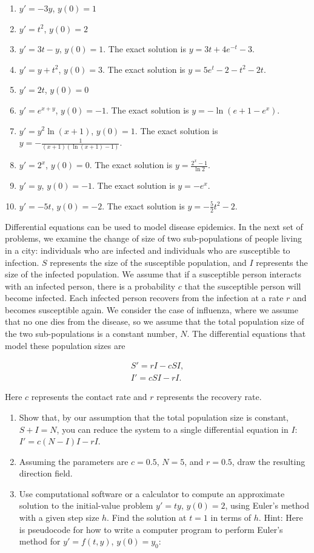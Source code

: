 \documentclass{exercises}
\begin{document}
\begin{enumerate}[resume]
\item $y'=-3y$, $y(0)=1$
\item $y'=t^{2}$, $y(0)=2$
\item $y'=3t-y$, $y(0)=1$. The exact solution is $y=3t+4e^{-t}-3$.
\item $y'=y+t^{2}$, $y(0)=3$. The exact solution is $y=5e^{t}-2-t^{2}-2t$.
\item $y'=2t$, $y(0)=0$
\item \techrequired $y'=e^{x+y}$, $y(0)=-1$. The exact solution is $y=-\ln(e+1-e^{x})$.
\item $y'=y^{2}\ln(x+1)$, $y(0)=1$. The exact solution is $y=-\frac{1}{(x+1)(\ln(x+1)-1)}$.
\item $y'=2^{x}$, $y(0)=0$. The exact solution is $y=\frac{2^{x}-1}{\ln 2}$.
\item $y'=y$, $y(0)=-1$. The exact solution is $y=-e^{x}$.
\item $y'=-5t$, $y(0)=-2$. The exact solution is $y=-\frac{5}{2}t^{2}-2$.
\end{enumerate}

Differential equations can be used to model disease epidemics. In the next set of problems, we examine the change of size of two sub-populations of people living in a city: individuals who are infected and individuals who are susceptible to infection. $S$ represents the size of the susceptible population, and $I$ represents the size of the infected population. We assume that if a susceptible person interacts with an infected person, there is a probability $c$ that the susceptible person will become infected. Each infected person recovers from the infection at a rate $r$ and becomes susceptible again. We consider the case of influenza, where we assume that no one dies from the disease, so we assume that the total population size of the two sub-populations is a constant number, $N$. The differential equations that model these population sizes are


\[\begin{array}{l}S'=rI-cSI, \\ I'=cSI-rI.\end{array}\]


Here $c$ represents the contact rate and $r$ represents the recovery rate.

\begin{enumerate}[resume]
\item Show that, by our assumption that the total population size is constant, $S+I=N$, you can reduce the system to a single differential equation in $I$: $I'=c(N-I)I-rI$.
\item Assuming the parameters are $c=0.5$, $N=5$, and $r=0.5$, draw the resulting direction field.
\item \techrequired Use computational software or a calculator to compute an approximate solution to the initial-value problem $y'=ty$, $y(0)=2$, using Euler's method with a given step size $h$. Find the solution at $t=1$ in terms of $h$. Hint: Here is pseudocode for how to write a computer program to perform Euler's method for $y'=f(t,y)$, $y(0)=y_{0}$:
\end{enumerate}
\end{document}
